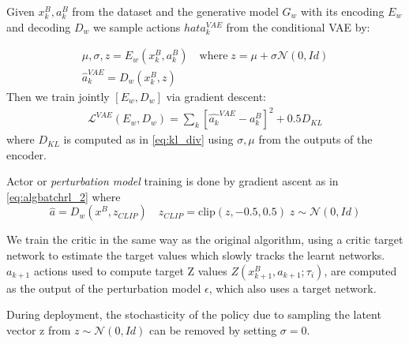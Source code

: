 Given $x_{k}^B,a_{k}^B$ from the dataset and the generative model $G_w$ with its encoding $E_w$ and decoding $D_w$
we sample actions $hat{a}_k^{VAE}$ from the conditional VAE by:

\begin{align}
    \mu, \sigma, z = E_w(x_{k}^B,a_{k}^B) \quad \text{where} \; z=\mu + \sigma \mathcal{N}(0,Id)\\
    \hat{a}_k^{VAE} = D_w(x_{k}^B, z)
\end{align}
Then we train jointly $[E_w,D_w]$ via gradient descent:
\begin{align}
    \mathcal{L}^{VAE}(E_w,D_w)= \sum_k[\hat{a_k}^{VAE}-a_{k}^B]^2 + 0.5 D_{KL}
\end{align}
where $D_{KL}$ is computed as in \ref{eq:kl_div} using $\sigma,\mu$ from the outputs of the encoder.

Actor or \textit{perturbation model} training is done by gradient ascent as in \ref{eq:algbatchrl_2}
where 
\begin{equation}
    \hat{a} = D_w(x^B, z_{CLIP}) \quad z_{CLIP} = \text{clip}(z, -0.5,0.5) \;z \sim \mathcal{N}(0,Id)
\end{equation}

We train the critic in the same way as the original algorithm,
using a critic target network to estimate the target values 
which slowly tracks the learnt networks.
$a_{k+1}$ actions used to compute target Z values $Z(x_{k+1}^B,a_{k+1}; \tau_i)$,
are computed as the output of the perturbation model $\epsilon$, which also uses a target network.

During deployment, the stochasticity of the policy due to sampling the latent vector z from 
$z \sim \mathcal{N}(0,Id)$ can be removed by setting $\sigma=0$.

